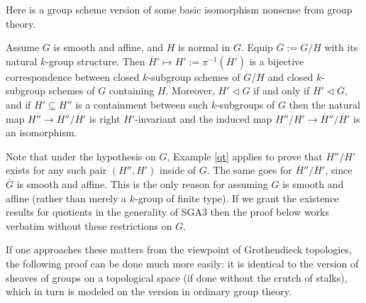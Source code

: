 \documentclass[10pt]{article}
\renewcommand{\(}{\left(}
\renewcommand{\)}{\right)}
\numberwithin{thm}{subsection}
\begin{document}
Here is a group scheme version of some basic isomorphism nonsense from group theory.

\begin{proposition}\label{gpbij} Assume $G$ is smooth and affine, and $H$ is normal in $G$.  Equip
$\overline{G} := G/H$ with its natural $k$-group structure.
Then $\overline{H}' \mapsto H' := \pi^{-1}(\overline{H}')$ is a bijective
correspondence between closed $k$-subgroup schemes of $G/H$ and closed
$k$-subgroup schemes of $G$ containing $H$.  Moreover,
$H' \lhd G$ if and only if $\overline{H}' \lhd \overline{G}$, and 
if $H' \subseteq H''$ is a containment between such $k$-subgroups of
$G$ then the natural map $H'' \rightarrow \overline{H}''/\overline{H}'$ is right $H'$-invariant
and the induced map $H''/H' \rightarrow \overline{H}''/\overline{H}'$ is an isomorphism. 
\end{proposition}

Note that under the hypothesis on $G$, Example \ref{qt} applies to prove
that $H''/H'$ exists for any such pair $(H'', H')$ inside of $G$.
The same goes for $\overline{H}''/\overline{H}'$, since $\overline{G}$ is smooth and affine.
This is the only reason for assuming
$G$ is smooth and affine (rather than merely a $k$-group of
finite type).  If we grant the existence results for quotients in the generality of SGA3
then the proof below works verbatim without these restrictions on $G$.

If one approaches these matters from the viewpoint of Grothendieck topologies, the following
proof can be done much more easily:  
it is identical to the version of sheaves of groups on a topological space (if done without the crutch
of stalks), which in turn is modeled on
the version in ordinary group theory.  
\end{document}
